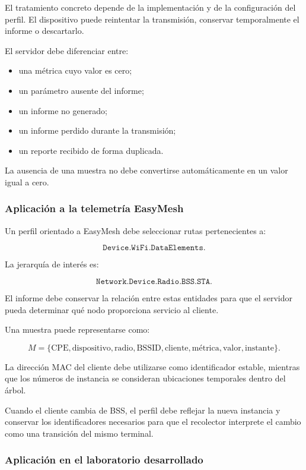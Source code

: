 El tratamiento concreto depende de la implementación y de la
configuración del perfil. El dispositivo puede reintentar la transmisión,
conservar temporalmente el informe o descartarlo.

El servidor debe diferenciar entre:

\begin{itemize}
    \item una métrica cuyo valor es cero;
    \item un parámetro ausente del informe;
    \item un informe no generado;
    \item un informe perdido durante la transmisión;
    \item un reporte recibido de forma duplicada.
\end{itemize}

La ausencia de una muestra no debe convertirse automáticamente en un
valor igual a cero.


\subsubsection*{Aplicación a la telemetría EasyMesh}

Un perfil orientado a EasyMesh debe seleccionar rutas pertenecientes a:

\[
    \texttt{Device.WiFi.DataElements.}
\]

La jerarquía de interés es:

\[
    \texttt{Network.Device.Radio.BSS.STA}.
\]

El informe debe conservar la relación entre estas entidades para que el
servidor pueda determinar qué nodo proporciona servicio al cliente.

Una muestra puede representarse como:

\[
    M =
    \{
        \text{CPE},
        \text{dispositivo},
        \text{radio},
        \text{BSSID},
        \text{cliente},
        \text{métrica},
        \text{valor},
        \text{instante}
    \}.
\]

La dirección MAC del cliente debe utilizarse como identificador estable,
mientras que los números de instancia se consideran ubicaciones
temporales dentro del árbol.

Cuando el cliente cambia de BSS, el perfil debe reflejar la nueva
instancia y conservar los identificadores necesarios para que el
recolector interprete el cambio como una transición del mismo terminal.


\subsubsection*{Aplicación en el laboratorio desarrollado}

